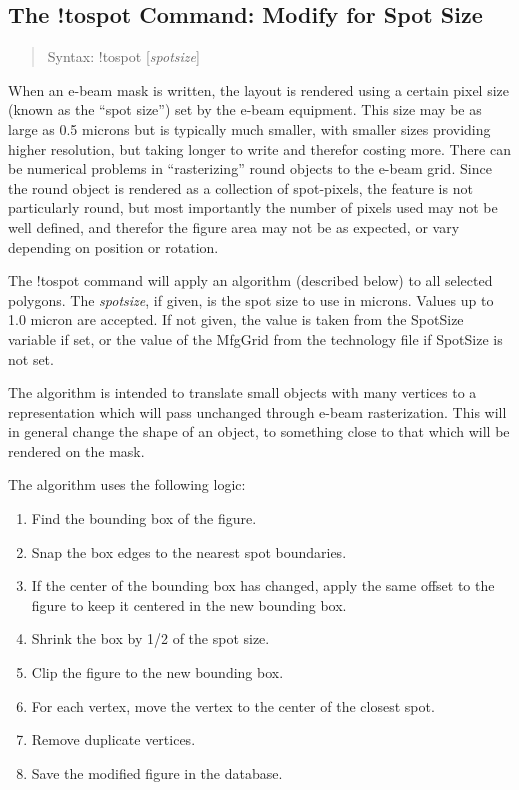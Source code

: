 \subsection{The {\cb !tospot} Command: Modify for Spot Size}
\begin{quote}
Syntax: {\vt !tospot} [{\it spotsize}]
\end{quote}
When an e-beam mask is written, the layout is rendered using a certain
pixel size (known as the ``spot size'') set by the e-beam equipment. 
This size may be as large as 0.5 microns but is typically much
smaller, with smaller sizes providing higher resolution, but taking
longer to write and therefor costing more.  There can be numerical
problems in ``rasterizing'' round objects to the e-beam grid.  Since
the round object is rendered as a collection of spot-pixels, the
feature is not particularly round, but most importantly the number of
pixels used may not be well defined, and therefor the figure area may
not be as expected, or vary depending on position or rotation.  {\Xic}

The {\cb !tospot} command will apply an algorithm (described below) to
all selected polygons.  The {\it spotsize}, if given, is the spot size
to use in microns.  Values up to 1.0 micron are accepted.  If not
given, the value is taken from the {\et SpotSize} variable if set, or
the value of the {\vt MfgGrid} from the technology file if {\et
SpotSize} is not set.

The algorithm is intended to translate small objects with many
vertices to a representation which will pass unchanged through e-beam
rasterization.  This will in general change the shape of an object, to
something close to that which will be rendered on the mask.

The algorithm uses the following logic:

\begin{enumerate}
\item{Find the bounding box of the figure.}
\item{Snap the box edges to the nearest spot boundaries.}
\item{If the center of the bounding box has changed, apply the same offset
    to the figure to keep it centered in the new bounding box.}
\item{Shrink the box by 1/2 of the spot size.}
\item{Clip the figure to the new bounding box.}
\item{For each vertex, move the vertex to the center of the closest spot.}
\item{Remove duplicate vertices.}
\item{Save the modified figure in the database.}
\end{enumerate}

